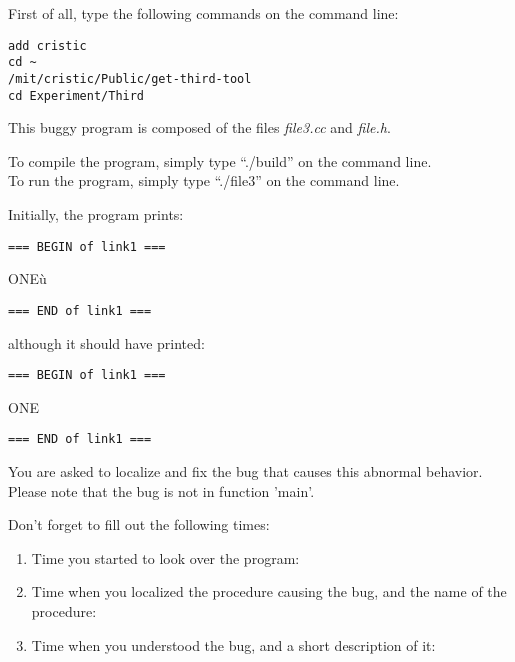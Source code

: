 \documentclass{article}
\title{}
\author{Bug 3 - Tool}
\date{July 30, 2003}
\begin{document}
\maketitle
\begin{flushleft}
\vspace{0.5in}

\thispagestyle{empty}

First of all, type the following commands on the command line:
\begin{verbatim}
add cristic
cd ~
/mit/cristic/Public/get-third-tool
cd Experiment/Third
\end{verbatim}


\vspace{0.1in}
This buggy program is composed of the files {\it file3.cc} and 
{\it file.h}. 

\vspace{0.1in}
To compile the program, simply type ``./build'' on the command line.\\
To run the program, simply type ``./file3'' on the command line.


\vspace{0.1in}
Initially, the program prints:


\begin{verbatim}
=== BEGIN of link1 ===
\end{verbatim}
\vspace{-0.08in}
ONE\`{u}
\vspace{-0.08in}
\begin{verbatim}
=== END of link1 ===
\end{verbatim}

although it should have printed:
\begin{verbatim}
=== BEGIN of link1 ===
\end{verbatim}
\vspace{-0.08in}
ONE
\vspace{-0.08in}
\begin{verbatim}
=== END of link1 ===
\end{verbatim}

You are asked to localize and fix the bug that causes this abnormal behavior.
Please note that the bug is not in function 'main'.


\vspace{0.3in}
Don't forget to fill out the following times:
\begin{enumerate}
\item{Time you started to look over the program:}
\item{Time when you localized the procedure causing the bug, and the name
      of the procedure:\vspace{0.2in}}
\item{Time when you understood the bug, and a short description of it:\vspace{0.4in}}


\end{enumerate}
\end{flushleft}
\end{document}

